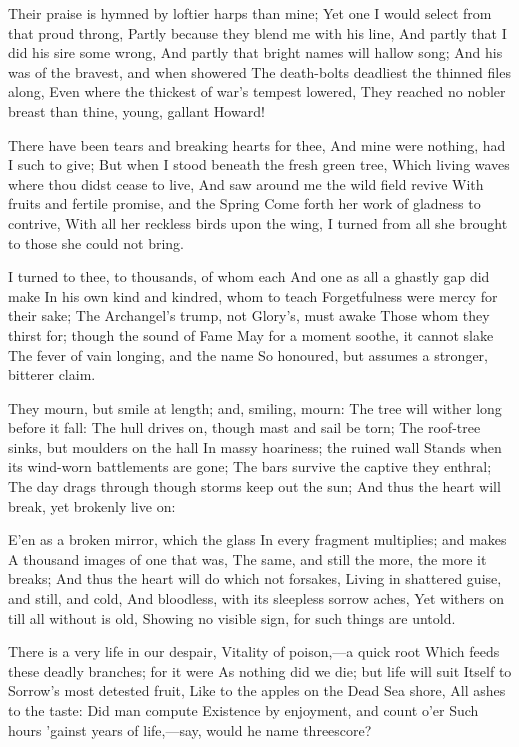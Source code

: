 \documentclass[10pt,twocolumn]{book}
\begin{document}
   Their praise is hymned by loftier harps than mine;
   Yet one I would select from that proud throng,
   Partly because they blend me with his line,
   And partly that I did his sire some wrong,
   And partly that bright names will hallow song;
   And his was of the bravest, and when showered
   The death-bolts deadliest the thinned files along,
   Even where the thickest of war's tempest lowered,
They reached no nobler breast than thine, young, gallant Howard!


   There have been tears and breaking hearts for thee,
   And mine were nothing, had I such to give;
   But when I stood beneath the fresh green tree,
   Which living waves where thou didst cease to live,
   And saw around me the wild field revive
   With fruits and fertile promise, and the Spring
   Come forth her work of gladness to contrive,
   With all her reckless birds upon the wing,
I turned from all she brought to those she could not bring.


   I turned to thee, to thousands, of whom each
   And one as all a ghastly gap did make
   In his own kind and kindred, whom to teach
   Forgetfulness were mercy for their sake;
   The Archangel's trump, not Glory's, must awake
   Those whom they thirst for; though the sound of Fame
   May for a moment soothe, it cannot slake
   The fever of vain longing, and the name
So honoured, but assumes a stronger, bitterer claim.


   They mourn, but smile at length; and, smiling, mourn:
   The tree will wither long before it fall:
   The hull drives on, though mast and sail be torn;
   The roof-tree sinks, but moulders on the hall
   In massy hoariness; the ruined wall
   Stands when its wind-worn battlements are gone;
   The bars survive the captive they enthral;
   The day drags through though storms keep out the sun;
And thus the heart will break, yet brokenly live on:


   E'en as a broken mirror, which the glass
   In every fragment multiplies; and makes
   A thousand images of one that was,
   The same, and still the more, the more it breaks;
   And thus the heart will do which not forsakes,
   Living in shattered guise, and still, and cold,
   And bloodless, with its sleepless sorrow aches,
   Yet withers on till all without is old,
Showing no visible sign, for such things are untold.


   There is a very life in our despair,
   Vitality of poison,---a quick root
   Which feeds these deadly branches; for it were
   As nothing did we die; but life will suit
   Itself to Sorrow's most detested fruit,
   Like to the apples on the Dead Sea shore,
   All ashes to the taste:  Did man compute
   Existence by enjoyment, and count o'er
Such hours 'gainst years of life,---say, would he name threescore?
\end{document}
